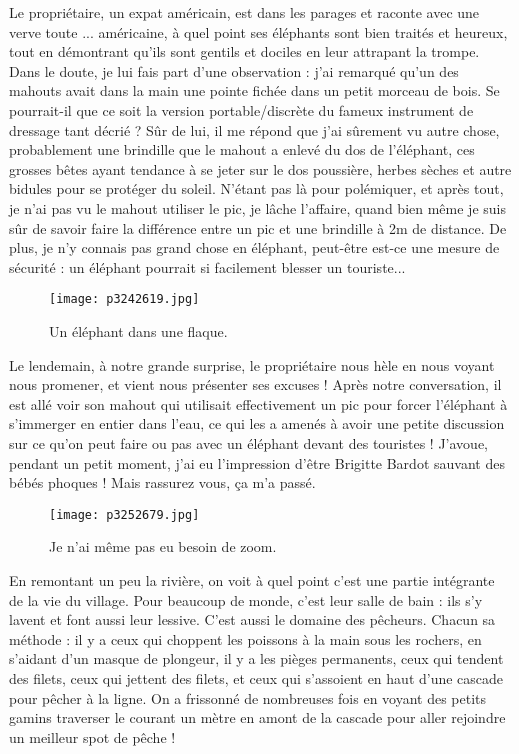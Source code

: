 \documentclass{book}
\begin{document}
Le propriétaire, un expat américain, est dans les parages et raconte avec une verve toute ... américaine, à quel point ses éléphants sont bien traités et heureux, tout en démontrant qu'ils sont gentils et dociles en leur attrapant la trompe. Dans le doute, je lui fais part d'une observation : j'ai remarqué qu'un des mahouts avait dans la main une pointe fichée dans un petit morceau de bois. Se pourrait-il que ce soit la version portable/discrète du fameux instrument de dressage tant décrié ? Sûr de lui, il me répond que j'ai sûrement vu autre chose, probablement une brindille que le mahout a enlevé du dos de l'éléphant, ces grosses bêtes ayant tendance à se jeter sur le dos poussière, herbes sèches et autre bidules pour se protéger du soleil. N'étant pas là pour polémiquer, et après tout, je n'ai pas vu le mahout utiliser le pic, je lâche l'affaire, quand bien même je suis sûr de savoir faire la différence entre un pic et une brindille à 2m de distance. De plus, je n'y connais pas grand chose en éléphant, peut-être est-ce une mesure de sécurité : un éléphant pourrait si facilement blesser un touriste...


\begin{figure}[h]
\centering
\texttt{[image: p3242619.jpg]}
\caption*{Un éléphant dans une flaque.}
\end{figure}

Le lendemain, à notre grande surprise, le propriétaire nous hèle en nous voyant nous promener, et vient nous présenter ses excuses ! Après notre conversation, il est allé voir son mahout qui utilisait effectivement un pic pour forcer l'éléphant à s'immerger en entier dans l'eau, ce qui les a amenés à avoir une petite discussion sur ce qu'on peut faire ou pas avec un éléphant devant des touristes ! J'avoue, pendant un petit moment, j'ai eu l'impression d'être Brigitte Bardot sauvant des bébés phoques ! Mais rassurez vous, ça m'a passé.


\begin{figure}[h]
\centering
\texttt{[image: p3252679.jpg]}
\caption*{Je n'ai même pas eu besoin de zoom.}
\end{figure}

En remontant un peu la rivière, on voit à quel point c'est une partie intégrante de la vie du village. Pour beaucoup de monde, c'est leur salle de bain : ils s'y lavent et font aussi leur lessive. C'est aussi le domaine des pêcheurs. Chacun sa méthode : il y a ceux qui choppent les poissons à la main sous les rochers, en s'aidant d'un masque de plongeur, il y a les pièges permanents, ceux qui tendent des filets, ceux qui jettent des filets, et ceux qui s'assoient en haut d'une cascade pour pêcher à la ligne. On a frissonné de nombreuses fois en voyant des petits gamins traverser le courant un mètre en amont de la cascade pour aller rejoindre un meilleur spot de pêche !
\end{document}
